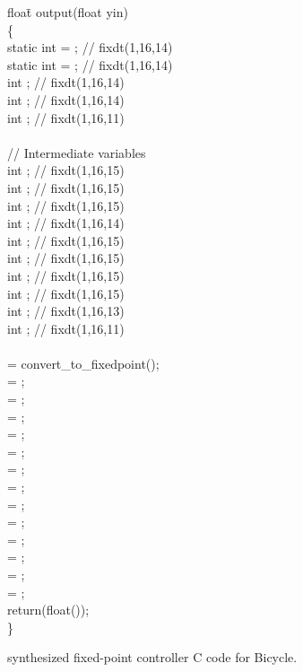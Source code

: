 \documentclass{amsart}
\numberwithin{equation}{section}
\begin{document}
\begin{figure}
\centering
\begin{tt}
\begin{scriptsize}
\parbox{0cm}{
\begin{tabbing}
floa\=t output(float yin)\ \ \=\\
\{\\
\>    static int  = ;\>	// fixdt(1,16,14) \\
\>    static int  = ;\>	// fixdt(1,16,14) \\
\>    int ;	\> 			// fixdt(1,16,14) \\
\>    int ;	\>			// fixdt(1,16,14) \\
\>    int ;		\>        		// fixdt(1,16,11) \\
\\    
\>    // Intermediate variables \\
\>    int ;              \>		// fixdt(1,16,15) \\
\>    int ;              \>		// fixdt(1,16,15) \\
\>    int ;              \>		// fixdt(1,16,15) \\
\>    int ;               \>		// fixdt(1,16,14) \\
\>    int ;              \>		// fixdt(1,16,15) \\
\>    int ;              \>		// fixdt(1,16,15) \\
\>    int ;              \>		// fixdt(1,16,15) \\
\>    int ;               \>		// fixdt(1,16,15) \\
\>    int ;              \>		// fixdt(1,16,13) \\
\>    int ;              \>		// fixdt(1,16,11) \\
\\    
\>     = convert\_to\_fixedpoint();  \\
\>     = ; \\
\>     = ; \\
\>     = ; \\
\>     = ; \\
\>     = ; \\
\>     = ; \\
\>     = ; \\
\>     = ; \\
\>     = ; \\
\>     = ; \\
\>     = ; \\
\>     = ; \\
\>     = ; \\
\>    return(float()); \\ 
\}
\end{tabbing}}
\end{scriptsize}
\end{tt}
\caption{synthesized fixed-point controller C code for Bicycle.} \label{fig:fxc}
\end{figure}
\end{document}
